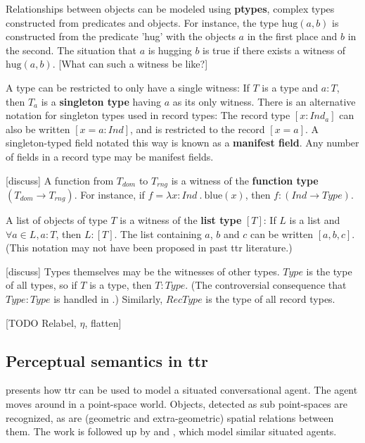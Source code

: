 Relationships between objects can be modeled using \textbf{ptypes}, complex types constructed from predicates and objects.
For instance, the type $\text{hug}(a,b)$ is constructed from the predicate 'hug' with the objects $a$ in the first place and $b$ in the second.
The situation that $a$ is hugging $b$ is true if there exists a witness of $\text{hug}(a,b)$.
[What can such a witness be like?]

A type can be restricted to only have a single witness:
If $T$ is a type and $a:T$, then $T_a$ is a \textbf{singleton type} having $a$ as its only witness.
There is an alternative notation for singleton types used in record types:
The record type $[x:Ind_a]$ can also be written $[x=a:Ind]$, and is restricted to the record $[x=a]$.
A singleton-typed field notated this way is known as a \textbf{manifest field}.
Any number of fields in a record type may be manifest fields.

[discuss] A function from $T_{dom}$ to $T_{rng}$ is a witness of the \textbf{function type} $(T_{dom} \rightarrow T_{rng})$.
For instance, if $f = \lambda x : Ind\ .\ \text{blue}(x)$, then $f : (Ind \rightarrow Type)$.

A list of objects of type $T$ is a witness of the \textbf{list type} $[T]$:
If $L$ is a list and $\forall a \in L, a : T$, then $L : [T]$.
The list containing $a$, $b$ and $c$ can be written $[a, b, c]$.
(This notation may not have been proposed in past \gls{ttr} literature.)

[discuss] Types themselves may be the witnesses of other types.
$Type$ is the type of all types, so if $T$ is a type, then $T : Type$.
(The controversial consequence that $Type : Type$ is handled in \citet[section 2.7]{CooperTypetheorysemantics2012}.)
Similarly, $RecType$ is the type of all record types.

[TODO Relabel, $\eta$, flatten]



\subsection{Perceptual semantics in \acrfull{ttr}}

\cite{DobnikModellinglanguageaction2012} presents how \gls{ttr} can be used to model a situated conversational agent.
The agent moves around in a point-space world.
Objects, detected as sub point-spaces are recognized, as are (geometric and extra-geometric) spatial relations between them.
The work is followed up by \cite{ttrspat} and \cite{lspc}, which model similar situated agents.

